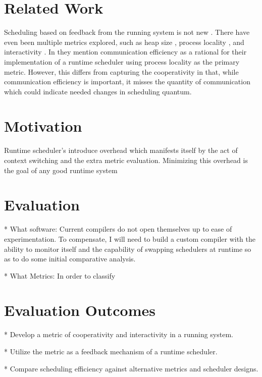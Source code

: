 \documentclass[11pt]{artikel3}
\begin{document}
\section{Related Work}

Scheduling based on feedback from the running system is not new \cite{dietz1997use}. There have even been multiple 
metrics explored, such as heap size \cite{white2012automated}, process locality \cite{debattista2002cache}, and interactivity \cite{reppy1993concurrent}. 
In \cite{ritson2012multicore} they mention communication efficiency as a rational for their implementation of a runtime scheduler using process locality 
as the primary metric. However, this differs from capturing the cooperativity in that, while communication efficiency is important, it misses the quantity 
of communication which could indicate needed changes in scheduling quantum.

\section{Motivation}

Runtime scheduler's introduce overhead which manifests itself by the act of context switching and the extra metric evaluation. Minimizing this overhead is the goal of any good runtime system

\section{Evaluation}

* What software: Current compilers do not open themselves up to ease of experimentation. To compensate, I will need to build a custom compiler with the ability to monitor itself and the capability of swapping schedulers at runtime so as to do some initial comparative analysis. 

* What Metrics: In order to classify 

\section{Evaluation Outcomes}

 * Develop a metric of cooperativity and interactivity in a running system.
 
 * Utilize the metric as a feedback mechanism of a runtime scheduler.
 
 * Compare scheduling efficiency against alternative metrics and scheduler designs.

\nocite{*}


\end{document}
